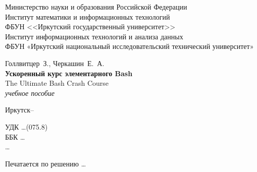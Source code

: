 \documentclass[a4paper,12pt,final,openany]{extbook}
\begin{document}
\thispagestyle{empty}
\begin{center}
  \small Министерство науки и образования Российской Федерации\\
Институт математики и информационных технологий\\
ФБУН <<Иркутский государственный университет>>\\
Институт информационных технологий и анализа данных\\
ФБУН  «Иркутский национальный исследовательский технический университет»

\end{center}
\vfill
\begin{center}
  {\sutitlefont
  Голлвитцер~З., Черкашин~Е.~А.\\[2em]
  {
  \Large\bfseries Ускоренный курс элементарного Bash\\
}
The Ultimate Bash Crash Course}\\
\vspace{1em}
\emph{учебное пособие}
\end{center}
\vspace{8em}
\vfill
\begin{center}
  Иркутск\;--
\end{center}
\mbox{}
\clearpage
\thispagestyle{empty}
\noindent УДК \ldots (075.8) \\ %
\noindent ББК \ldots \\ %
\noindent\mbox{}\hspace{2em}\ldots %
\begin{center}\small
Печатается по решению \ldots %
\end{center}
\vspace{0.5ex}
\begin{center}\small
\end{center}
\end{document}

